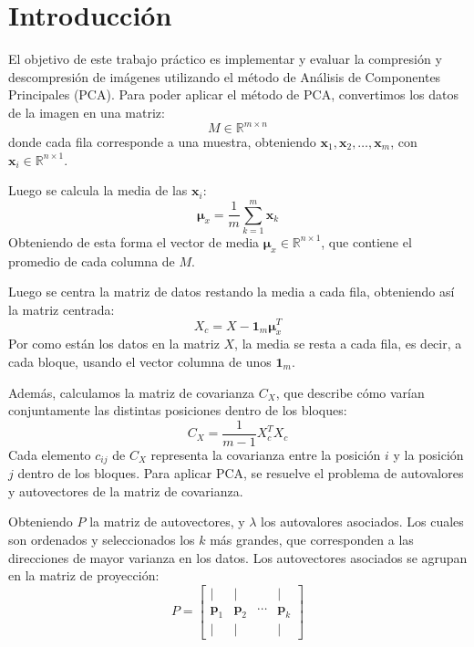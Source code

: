 \documentclass[a4paper,12pt]{article}
\begin{document}
\newpage
\section*{Introducción}
El objetivo de este trabajo práctico es implementar y evaluar la compresión y descompresión de imágenes utilizando el método de Análisis de Componentes Principales (PCA).
Para poder aplicar el método de PCA, convertimos los datos de la imagen en una matriz:
\begin{equation}
M \in \mathbb{R}^{m \times n}
\label{eq:matrizM}
\end{equation}
donde cada fila corresponde a una muestra, obteniendo $\mathbf{x}_1, \mathbf{x}_2, \ldots, \mathbf{x}_m$, con $\mathbf{x}_i \in \mathbb{R}^{n \times 1}$.

Luego se calcula la media de las $\mathbf{x}_i$:
\begin{equation}
\boldsymbol{\mu}_x = \frac{1}{m} \sum_{k=1}^m \mathbf{x}_{k}
\label{eq:media}
\end{equation}
Obteniendo de esta forma el vector de media $\boldsymbol{\mu}_x \in \mathbb{R}^{n \times 1}$, que contiene el promedio de cada columna de $M$.

Luego se centra la matriz de datos restando la media a cada fila, obteniendo así la matriz centrada:
\begin{equation}
X_c = X - \mathbf{1}_m \boldsymbol{\mu}_x^T
\label{eq:centrado}
\end{equation}
Por como están los datos en la matriz $X$, la media se resta a cada fila, es decir, a cada bloque, usando el vector columna de unos $\mathbf{1}_m$.

Además, calculamos la matriz de covarianza $C_X$, que describe cómo varían conjuntamente las distintas posiciones dentro de los bloques:
\begin{equation}
C_X = \frac{1}{m-1} X_c^T X_c
\label{eq:covarianza}
\end{equation}
Cada elemento $c_{ij}$ de $C_X$ representa la covarianza entre la posición $i$ y la posición $j$ dentro de los bloques.
Para aplicar PCA, se resuelve el problema de autovalores y autovectores de la matriz de covarianza.

Obteniendo $P$ la matriz de autovectores, y $\lambda$ los autovalores asociados. Los cuales son ordenados y seleccionados los $k$ más grandes, que corresponden a las direcciones de mayor varianza en los datos. Los autovectores asociados se agrupan en la matriz de proyección:
\begin{equation}
P = \begin{bmatrix}
| & | &        & | \\
\mathbf{p}_1 & \mathbf{p}_2 & \cdots & \mathbf{p}_k \\
| & | &        & |
\end{bmatrix}
\label{eq:autovectores}
\end{equation}
\end{document}
